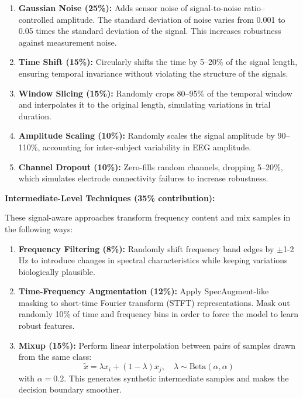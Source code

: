 \documentclass[conference]{IEEEtran}
\begin{document}
\begin{enumerate}
    \item \textbf{Gaussian Noise (25\%):} Adds sensor noise of signal-to-noise ratio–controlled amplitude. The standard deviation of noise varies from 0.001 to 0.05 times the standard deviation of the signal. This increases robustness against measurement noise.
    
    \item \textbf{Time Shift (15\%):} Circularly shifts the time by 5–20\% of the signal length, ensuring temporal invariance without violating the structure of the signals.
    
    \item \textbf{Window Slicing (15\%):} Randomly crops 80–95\% of the temporal window and interpolates it to the original length, simulating variations in trial duration.
    
    \item \textbf{Amplitude Scaling (10\%):} Randomly scales the signal amplitude by 90–110\%, accounting for inter-subject variability in EEG amplitude.
    
    \item \textbf{Channel Dropout (10\%):} Zero-fills random channels, dropping 5–20\%, which simulates electrode connectivity failures to increase robustness.
\end{enumerate}

\textbf{Intermediate-Level Techniques (35\% contribution):}

These signal-aware approaches transform frequency content and mix samples in the following ways:

\begin{enumerate}
    \item \textbf{Frequency Filtering (8\%):} Randomly shift frequency band edges by $\pm$1-2 Hz to introduce changes in spectral characteristics while keeping variations biologically plausible.
    
    \item \textbf{Time-Frequency Augmentation (12\%):} Apply SpecAugment-like masking to short-time Fourier transform (STFT) representations. Mask out randomly 10\% of time and frequency bins in order to force the model to learn robust features.
    
    \item \textbf{Mixup (15\%):} Perform linear interpolation between pairs of samples drawn from the same class:
    \begin{equation}
    \tilde{x} = \lambda x_i + (1-\lambda) x_j, \quad \lambda \sim \text{Beta}(\alpha, \alpha)
    \end{equation}
    with $\alpha = 0.2$. This generates synthetic intermediate samples and makes the decision boundary smoother.
\end{enumerate}
\end{document}
